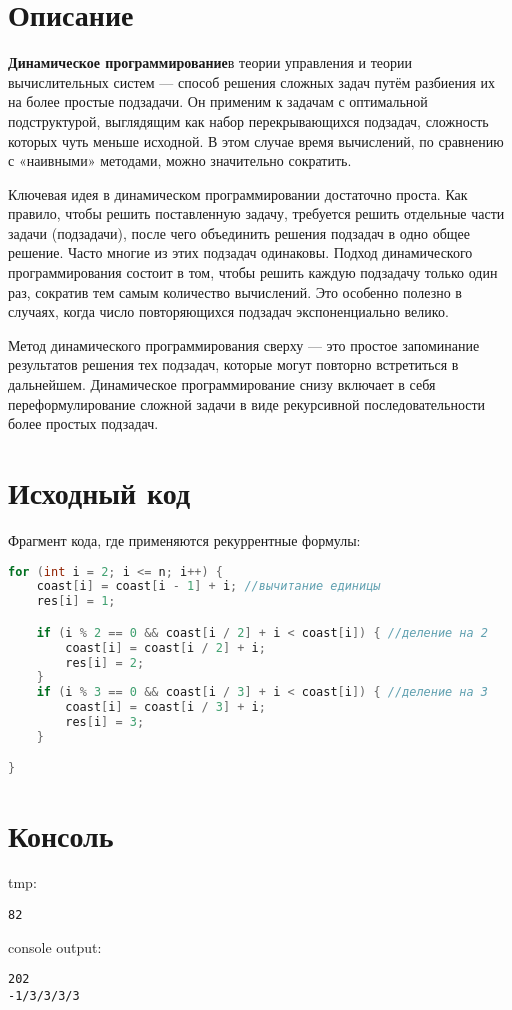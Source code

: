 \section{Описание}

\textbf{Динамическое программирование}\newline в теории управления и теории вычислительных систем — способ решения сложных задач путём разбиения их на более простые подзадачи. Он применим к задачам с оптимальной подструктурой, выглядящим как набор перекрывающихся подзадач, сложность которых чуть меньше исходной. В этом случае время вычислений, по сравнению с «наивными» методами, можно значительно сократить.\newline

Ключевая идея в динамическом программировании достаточно проста. Как правило, чтобы решить поставленную задачу, требуется решить отдельные части задачи (подзадачи), после чего объединить решения подзадач в одно общее решение. Часто многие из этих подзадач одинаковы. Подход динамического программирования состоит в том, чтобы решить каждую подзадачу только один раз, сократив тем самым количество вычислений. Это особенно полезно в случаях, когда число повторяющихся подзадач экспоненциально велико.\newline

Метод динамического программирования сверху — это простое запоминание результатов решения тех подзадач, которые могут повторно встретиться в дальнейшем. Динамическое программирование снизу включает в себя переформулирование сложной задачи в виде рекурсивной последовательности более простых подзадач.\newline
\pagebreak

\section{Исходный код}
Фрагмент кода, где применяются рекуррентные формулы:\newline


\begin{lstlisting}[language=C]
for (int i = 2; i <= n; i++) {
    coast[i] = coast[i - 1] + i; //вычитание единицы
    res[i] = 1;

    if (i % 2 == 0 && coast[i / 2] + i < coast[i]) { //деление на 2
        coast[i] = coast[i / 2] + i;
        res[i] = 2;
    }
    if (i % 3 == 0 && coast[i / 3] + i < coast[i]) { //деление на 3
        coast[i] = coast[i / 3] + i;
        res[i] = 3;
    }

}    
\end{lstlisting}

\section{Консоль}
tmp:
\begin{alltt}
82
\end{alltt}

console output:
\begin{alltt}
202
-1 /3 /3 /3 /3
\end{alltt}
\pagebreak